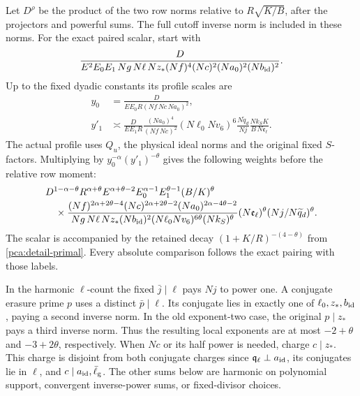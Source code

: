 Let \(D^\rho\) be the product of the
two row norms relative to \(R\sqrt{K/B}\), after the projectors
and powerful sums. The full cutoff inverse norm is included
in these norms. For the exact paired scalar, start with
\[
 \frac{D}{E^2E_0E_1\,Ng\,N\ell\,Nz_*
          (Nf)^4(Nc)^2(Na_0)^2(Nb_{\rm id})^2}.
\]
Up to the fixed dyadic constants its profile scales are
\[
 \begin{aligned}
 y_0&=\frac{D}{EE_0 R(Nf\,Nc\,Na_0)^2},\\
 y'_1&\asymp
 \frac{D}{EE_1 R}\frac{(Na_0)^4}{(Nf\,Nc)^2}
 (N\ell_0 Nv_6)^6\frac{N\widetilde q_d}{Nj}
             \frac{Nk_S K}{B\,N\mathfrak e_\ell}.
 \end{aligned}
\]
The actual profile uses \(Q_u\), the physical ideal norms
and the original fixed \(S\)-factors.
Multiplying by \(y_0^{-\alpha}(y'_1)^{-\theta}\) gives the
following weights before the relative row moment:
\begin{equation}\label{pca:detail-scalar}
 \begin{aligned}
 &D^{1-\alpha-\theta}R^{\alpha+\theta}E^{\alpha+\theta-2}
   E_0^{\alpha-1} E_1^{\theta-1}(B/K)^\theta\\[-2pt]
 &\quad{}\times
 \frac{(Nf)^{2\alpha+2\theta-4}(Nc)^{2\alpha+2\theta-2}
       (Na_0)^{2\alpha-4\theta-2}}
      {Ng\,N\ell\,Nz_*(Nb_{\rm id})^2
        (N\ell_0 Nv_6)^{6\theta}(Nk_S)^\theta}
 (N\mathfrak e_\ell)^\theta
       (Nj/N\widetilde q_d)^\theta .
 \end{aligned}
\end{equation}
The scalar is accompanied by the retained decay
\((1+K/R)^{-(4-\theta)}\) from \eqref{pca:detail-primal}.
Every absolute comparison follows the exact pairing with those labels.

In the harmonic \(\ell\)-count the fixed \(\bar j\mid\ell\)
pays \(Nj\) to power one. A conjugate erasure prime \(p\) uses a
distinct \(\bar p\mid\ell\). Its conjugate lies in exactly one of
\(\ell_0,z_*,b_{\rm id}\), paying a second inverse norm. In the
old exponent-two case, the original \(p\mid z_*\) pays a third
inverse norm. Thus the resulting local exponents are at most
\(-2+\theta\) and \(-3+2\theta\), respectively. When \(Nc\)
or its half power is needed, charge \(c\mid z_*\). This charge
is disjoint from both conjugate charges since
\(\mathfrak q_\ell\perp a_{\rm id}\), its conjugates lie in
\(\ell\), and \(c\mid a_{\rm id},\bar\ell_{\rm g}\).
The other sums below are harmonic on polynomial support,
convergent inverse-power sums, or fixed-divisor choices.

